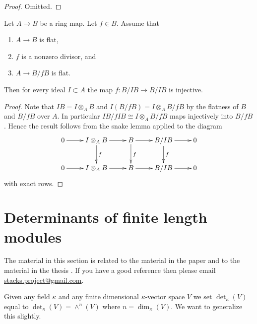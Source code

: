 \begin{proof}
Omitted.
\end{proof}





\begin{lemma}
\label{lemma-relative-effective-cartier-algebra}
Let $A \to B$ be a ring map. Let $f \in B$. Assume that
\begin{enumerate}
\item $A \to B$ is flat,
\item $f$ is a nonzero divisor, and
\item $A \to B/fB$ is flat.
\end{enumerate}
Then for every ideal $I \subset A$ the map
$f : B/IB \to B/IB$ is injective.
\end{lemma}

\begin{proof}
Note that $IB = I \otimes_A B$ and $I(B/fB) = I\otimes_A B/fB$
by the flatness of $B$ and $B/fB$ over $A$.
In particular $IB/fIB \cong I \otimes_A B/fB$ maps injectively
into $B/fB$. Hence the result follows from the snake lemma applied
to the diagram
$$
\xymatrix{
0 \ar[r] &
I \otimes_A B \ar[r] \ar[d]^f &
B \ar[r] \ar[d]^f &
B/IB \ar[r] \ar[d]^f &
0 \\
0 \ar[r] &
I \otimes_A B \ar[r] &
B \ar[r] &
B/IB \ar[r] &
0
}
$$
with exact rows.
\end{proof}




\section{Determinants of finite length modules}
\label{section-determinants-finite-length}

\noindent
The material in this section is related to the material in
the paper \cite{determinant} and to the material in the
thesis \cite{Joe}. If you have a good reference then please
email \href{mailto:stacks.project@gmail.com}{stacks.project@gmail.com}.

\medskip\noindent
Given any field $\kappa$ and
any finite dimensional $\kappa$-vector space $V$ we set
$\det\nolimits_\kappa(V)$ equal to $\det\nolimits_\kappa(V) = \wedge^n(V)$
where $n = \dim_\kappa(V)$. We want to generalize this slightly.

